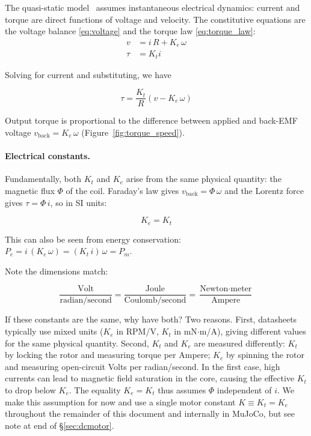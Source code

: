 \documentclass[10pt, a4paper, twocolumn]{article}
\begin{document}
\noindent The quasi-static model~\cite{hughes2019, maxon_formulas, simscape_dcmotor} assumes instantaneous electrical dynamics: current and torque are direct functions of voltage and velocity. The constitutive equations are the voltage balance \eqref{eq:voltage} and the torque law \eqref{eq:torque_law}:
\begin{subequations}
\label{eq:motor_laws}
\begin{align}
  v &= i \, R + K_e \, \omega \label{eq:voltage} \\
  \tau &= K_t i \label{eq:torque_law}
\end{align}
\end{subequations}

\noindent Solving for current and substituting, we have

\begin{equation}
  \tau = \frac{K_t}{R} (v - K_e \, \omega)
  \label{eq:torque_speed}
\end{equation}

\noindent Output torque is proportional to the difference between applied and back-EMF voltage $v_{\text{back}} = K_e \, \omega$ (Figure~\ref{fig:torque_speed}).

\paragraph{Electrical constants.}
Fundamentally, both $K_t$ and $K_e$ arise from the same physical quantity: the magnetic flux $\Phi$ of the coil. Faraday's law gives $v_{\text{back}} = \Phi \, \omega$ and the Lorentz force gives $\tau = \Phi \, i$, so in SI units:

\begin{equation*}
  K_e = K_t
  \label{eq:ke_eq_kt}
\end{equation*}

\noindent This can also be seen from energy conservation: $P_e = i \, (K_e \, \omega) = (K_t \, i) \, \omega = P_m$.

\pagebreak
\noindent Note the dimensions match:

\vspace*{-\abovedisplayskip}
\begin{equation*}
  \frac{\text{Volt}}{\text{radian}/\text{second}}
  = \frac{\text{Joule}}{\text{Coulomb}/\text{second}}
  = \frac{\text{Newton} \cdot \text{meter}}{\text{Ampere}}
\end{equation*}

\noindent If these constants are the same, why have both? Two reasons. First, datasheets typically use mixed units ($K_e$ in RPM/V, $K_t$ in mN$\cdot$m/A), giving different values for the same physical quantity. Second, $K_t$ and $K_e$ are measured differently: $K_t$ by locking the rotor and measuring torque per Ampere; $K_e$ by spinning the rotor and measuring open-circuit Volts per radian/second. In the first case, high currents can lead to magnetic field saturation in the core, causing the effective $K_t$ to drop below $K_e$. The equality $K_e = K_t$ thus assumes $\Phi$ independent of $i$. We make this assumption for now and use a single motor constant $K \equiv K_t = K_e$ throughout the remainder of this document and internally in MuJoCo, but see note at end of \S\ref{sec:dcmotor}.
\end{document}
